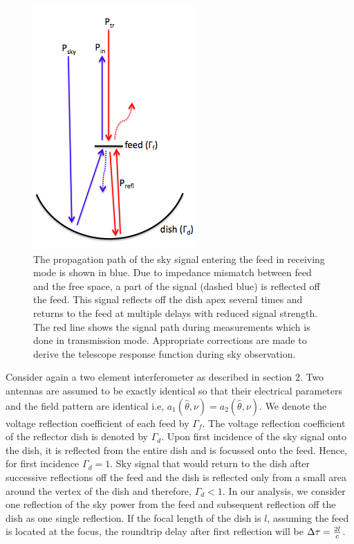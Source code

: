 \documentclass[iop]{emulateapj}
\newcommand{\thhat}{{\hat\theta}}
\begin{document}
\begin{figure}[ht!]
\centering
\includegraphics[totalheight=0.35\textheight]{plots/reflection_cartoon.png}
\caption{The propagation path of the sky signal entering the
feed in receiving mode is shown in blue. Due to impedance mismatch between feed and the free space, a part of the signal (dashed blue) is reflected off the feed. This signal reflects off the dish apex several times and returns to the feed at multiple delays with reduced signal strength. The red line shows the signal path during measurements which is done in transmission mode. Appropriate corrections are made to derive the telescope response function during sky observation. }
\label{fig:cartoon}
\end{figure}

Consider again a two element interferometer as described in section 2. Two antennas are assumed to be exactly identical so that their electrical parameters and the field pattern are identical i.e, $a_{1}(\thhat,\nu) = a_{2}(\thhat,\nu)$. We denote the voltage reflection coefficient of each feed by $\Gamma_{f}$. The voltage reflection coefficient of the reflector dish is denoted by $\Gamma_{d}$. Upon first incidence of the sky signal onto the dish, it is reflected from the entire dish and is focussed onto the feed. Hence, for first incidence $\Gamma_{d}=1$. Sky signal that would return to the dish after successive reflections off the feed and the dish is reflected only from a small area around the vertex of the dish and therefore, $\Gamma_{d}<1$. In our analysis, we consider one reflection of the sky power from the feed and subsequent reflection off the dish as one single reflection. If the focal length of the dish is $l$, assuming the feed is located at the focus, the roundtrip delay after first reflection will be $\Delta \tau = {2l \over c}$. 
\end{document}
